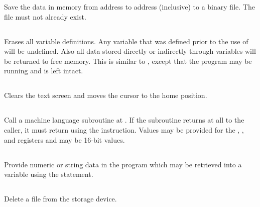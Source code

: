 \documentclass{report}
\begin{document}
    Save the data in memory from address  to address  (inclusive) to a binary file.
    The file must not already exist.

    \subsection*{}

    Erases all variable definitions. Any variable that was defined prior to the use of  will be undefined.
    Also all data stored directly or indirectly through variables will be returned to free memory. This is similar to
    , except that the program may be running and is left intact.

    \subsection*{}

    Clears the text screen and moves the cursor to the home position.

    \subsection*{}

    Call a machine language subroutine at . If the subroutine returns at all to the caller, it
    must return using the  instruction. Values may be provided for the , , and
     registers and may be 16-bit values.

    \subsection*{}

    Provide numeric or string data in the program which may be retrieved into a variable using the  statement.

    \subsection*{ }

    Delete a file from the storage device.

    \subsection*{}
\end{document}
